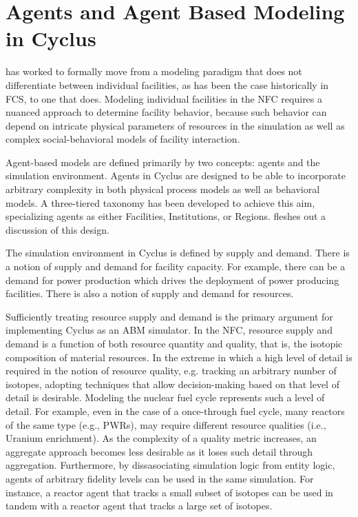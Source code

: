 
\section{Agents and Agent Based Modeling in Cyclus}\label{abm:abm}

\Cyclus has worked to formally move from a modeling paradigm that does not
differentiate between individual facilities, as has been the case historically
in FCS, to one that does. Modeling individual facilities in the NFC requires a
nuanced approach to determine facility behavior, because such behavior can
depend on intricate physical parameters of resources in the simulation as well
as complex social-behavioral models of facility interaction.

Agent-based models are defined primarily by two concepts: agents and the
simulation environment. Agents in Cyclus are designed to be able to incorporate
arbitrary complexity in both physical process models as well as behavioral
models. A three-tiered taxonomy has been developed to achieve this aim,
specializing agents as either Facilities, Institutions, or
Regions.  fleshes out a discussion of this design.

The simulation environment in Cyclus is defined by supply and demand. There is a
notion of supply and demand for facility capacity. For example, there can be a
demand for power production which drives the deployment of power producing
facilities. There is also a notion of supply and demand for resources. 

Sufficiently treating resource supply and demand is the primary argument for
implementing Cyclus as an ABM simulator. In the NFC, resource supply and demand
is a function of both resource quantity and quality, that is, the isotopic
composition of material resources. In the extreme in which a high level of
detail is required in the notion of resource quality, e.g. tracking an arbitrary
number of isotopes, adopting techniques that allow decision-making based on that
level of detail is desirable. Modeling the nuclear fuel cycle represents such a
level of detail. For example, even in the case of a once-through fuel cycle,
many reactors of the same type (e.g., PWRs), may require different resource
qualities (i.e., Uranium enrichment). As the complexity of a quality metric
increases, an aggregate approach becomes less desirable as it loses such detail
through aggregation. Furthermore, by dissasociating simulation logic from entity
logic, agents of arbitrary fidelity levels can be used in the same
simulation. For instance, a reactor agent that tracks a small subset of isotopes
can be used in tandem with a reactor agent that tracks a large set of isotopes.

